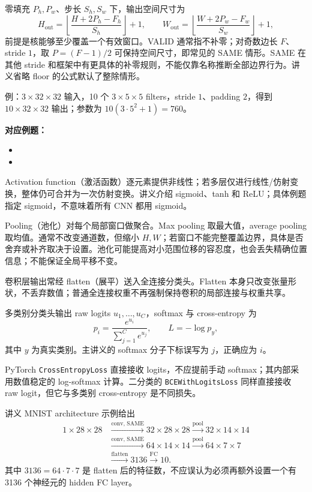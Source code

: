零填充 $P_h,P_w$、步长 $S_h,S_w$ 下，输出空间尺寸为
\[
  H_{\mathrm{out}}=\left\lfloor\frac{H+2P_h-F_h}{S_h}\right\rfloor+1,
  \qquad
  W_{\mathrm{out}}=\left\lfloor\frac{W+2P_w-F_w}{S_w}\right\rfloor+1,
\]
前提是核能够至少覆盖一个有效窗口。VALID 通常指不补零；对奇数边长 $F$、stride $1$，取 $P=(F-1)/2$ 可保持空间尺寸，即常见的 SAME 情形。SAME 在其他 stride 和框架中有更具体的补零规则，不能仅靠名称推断全部边界行为。讲义省略 floor 的公式默认了整除情形。

例：$3\times32\times32$ 输入，10 个 $3\times5\times5$ filters，stride $1$、padding $2$，得到 $10\times32\times32$ 输出；参数为 $10(3\cdot5^2+1)=760$。

\textbf{对应例题：}
\begin{itemize}
  \item {}
  \item {}
\end{itemize}


Activation function（激活函数）逐元素提供非线性；若多层仅进行线性/仿射变换，整体仍可合并为一次仿射变换。讲义介绍 sigmoid、tanh 和 ReLU；具体例题指定 sigmoid，不意味着所有 CNN 都用 sigmoid。

Pooling（池化）对每个局部窗口做聚合。Max pooling 取最大值，average pooling 取均值。通常不改变通道数，但缩小 $H,W$；若窗口不能完整覆盖边界，具体是否舍弃或补齐取决于设置。池化可能提高对小范围位移的容忍度，也会丢失精确位置信息；不能保证全局平移不变。

卷积层输出常经 flatten（展平）送入全连接分类头。Flatten 本身只改变张量形状，不丢弃数值；普通全连接权重不再强制保持卷积的局部连接与权重共享。


多类别分类头输出 raw logits $u_1,\ldots,u_C$，softmax 与 cross-entropy 为
\[
  p_i=\frac{e^{u_i}}{\sum_{j=1}^{C}e^{u_j}},
  \qquad L=-\log p_y,
\]
其中 $y$ 为真实类别。主讲义的 softmax 分子下标误写为 $j$，正确应为 $i$。

PyTorch \texttt{CrossEntropyLoss} 直接接收 logits，不应提前手动 softmax；其内部采用数值稳定的 log-softmax 计算。二分类的 \texttt{BCEWithLogitsLoss} 同样直接接收 raw logit，但它与多类别 cross-entropy 是不同损失。

讲义 MNIST architecture 示例给出
\[
\begin{aligned}
  1\times28\times28
  &\xrightarrow{\text{conv, SAME}}32\times28\times28
  \xrightarrow{\text{pool}}32\times14\times14\\
  &\xrightarrow{\text{conv, SAME}}64\times14\times14
  \xrightarrow{\text{pool}}64\times7\times7\\
  &\xrightarrow{\text{flatten}}3136
  \xrightarrow{\text{FC}}10.
\end{aligned}
\]
其中 $3136=64\cdot7\cdot7$ 是 flatten 后的特征数，不应误认为必须再额外设置一个有 3136 个神经元的 hidden FC layer。

